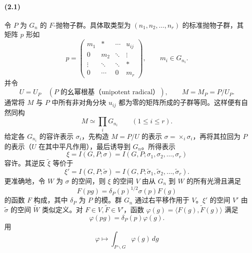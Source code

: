 \paragraph*{(2.1)} 令 $P$ 为 $G_n$ 的 $F$-抛物子群。具体取类型为 $(n_1,n_2,\ldots,n_r)$ 的标准抛物子群，其矩阵 $p$ 形如
\begin{equation}
 p=\begin{pmatrix}m_1&*&\cdots&u_{ij}\\0&m_2&\ddots&\vdots\\\vdots&\ddots&\ddots&*\\0&\cdots&0&m_r\end{pmatrix},\qquad m_i\in G_{n_i}.\tag{2.1.1}
\end{equation}
并令
\begin{equation}
 U=U_P\quad(P\text{ 的幺幂根基（unipotent radical）}),\qquad M=M_P=P/U_P.\tag{2.1.2}
\end{equation}
通常将 $M$ 与 $P$ 中所有非对角分块 $u_{ij}$ 都为零的矩阵所成的子群等同。这样便有自然同构
\begin{equation}
 M\simeq\prod_iG_{n_i}\qquad(1\leq i\leq r).\tag{2.1.3}
\end{equation}
给定各 $G_{n_i}$ 的容许表示 $\sigma_i$，先构造 $M=P/U$ 的表示 $\sigma=\mathop{\times}_i\sigma_i$，再将其拉回为 $P$ 的表示（$U$ 在其中平凡作用），最后诱导到 $G_n$。所得表示
\begin{equation}
 \xi=I(G,P;\sigma)=I(G,P;\sigma_1,\sigma_2,\ldots,\sigma_r)\tag{2.1.4}
\end{equation}
容许。其逆反 $\widetilde\xi$ 等价于
\begin{equation}
 \xi'=I(G,P;\widetilde\sigma)=I(G,P;\widetilde\sigma_1,\widetilde\sigma_2,\ldots,\widetilde\sigma_r).\tag{2.1.5}
\end{equation}
更准确地，令 $W$ 为 $\sigma$ 的空间，则 $\xi$ 的空间 $V$ 由从 $G_n$ 到 $W$ 的所有光滑且满足
\begin{equation}
 F(pg)=\delta_P(p)^{1/2}\sigma(p)F(g)\tag{2.1.6}
\end{equation}
的函数 $F$ 构成，其中 $\delta_P$ 为 $P$ 的模。群 $G_n$ 通过右平移作用于 $V$。$\xi'$ 的空间 $V'$ 由 $\widetilde\sigma$ 的空间 $\widetilde W$ 类似定义。对 $F\in V,\widetilde F\in V'$，函数 $\varphi(g)=\langle F(g),\widetilde F(g)\rangle$ 满足
\begin{equation}
 \varphi(pg)=\delta_P(p)\varphi(g).\tag{2.1.7}
\end{equation}
用
\begin{equation}
 \varphi\longmapsto\int_{P\backslash G}\varphi(g)\,dg\tag{2.1.8}
\end{equation}
